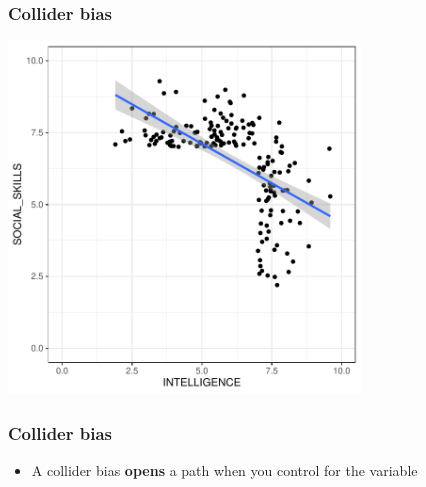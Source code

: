 \documentclass[aspectratio=43]{beamer}
\begin{document}
\begin{frame}
\frametitle{Collider bias}
\centering

\includegraphics[width = 0.7\textwidth]{../img/collider4}

\end{frame}

\begin{frame}
\frametitle{Collider bias}
\centering

\begin{itemize}
  \item A collider bias \textbf{opens} a path when you control for the variable
\end{itemize}

\end{frame}
\end{document}
